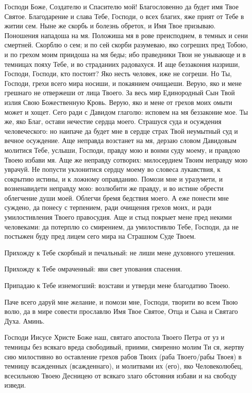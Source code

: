\begin{mymulticols}

Господи Боже, Создателю и Спасителю мой! Благословенно да будет имя Твое Святое. Благодарение и слава Тебе, Господи, о всех благих, яже прият от Тебе в житии сем. Ныне же скорбь и болезнь обретох, и Имя Твое призываю. Поношения нападоша на мя. Положиша мя в рове преисподнем, в темных и сени смертней. Скорблю о сем; и по сей скорби разумеваю, яко согреших пред Тобою, и по грехом моим приидоша на мя беды; ибо праведники Твои не унывающе и в темницах пояху Тебе, и во страданиих радовахуся. И аще беззакония назриши, Господи, Господи, кто постоит? Яко несть человек, иже не согреши. Но Ты, Господи, грехи всего мира носиши, и покаянием очищаеши. Верую, яко и мене грешнаго не отвержеши от лица Твоего. За весь мир Единородный Сын Твой излия Свою Божественную Кровь. Верую, яко и мене от грехов моих омыти может и хощет. Сего ради с Давидом глаголю: исповем на мя беззаконие мое. Ты же, яко Благ, остави нечестие сердца моего. Страшуся суда и осуждения человеческого: но наипаче да будет мне в сердце страх Твой неумытный суд и вечное осуждение. Аще неправда возстанет на мя, дерзаю словом Давидовым молитися Тебе, услыши, Господи, правду мою и вонми суду моему, и правдою Твоею избави мя. Аще же неправду сотворих: милосердием Твоим неправду мою уврачуй. Не попусти уклонитися сердцу моему во словеса лукавствия, к сокрытию истины, и к ложному оправданию. Помози мне и уразумети, и возненавидети неправду мою: возлюбити же правду, и во истине обрести облегчение души моей. Облегчи бремя бедствия моего. А еже понести мне суждено, да понесу с терпением, ради очищения грехов моих, и ради умилостивления Твоего правосудия. Аще и стыд покрыет мене пред некими человеками: да потерплю со смирением, да умилостивлю Тебе, Господи, да не постыжен буду пред лицем сего мира на Страшном Суде Твоем.

Прихожду к Тебе скорбный и печальный: не лиши мене духовного утешения. 

Прихожду к Тебе омраченный: яви свет упования спасения. 

Припадаю к Тебе изнемогший: возстави и утверди мене благодатию Твоею. 

Паче всего даруй мне желание, и помози мне, Господи, творити во всем Твою волю, да в мире совести прославлю Имя Твое Святое, Отца и Сына и Святаго Духа. Аминь.

\end{mymulticols}

\mychapterending

\begin{mymulticols}


Господи Иисусе Христе Боже наш, святаго апостола Твоего Петра от уз и темницы без всякаго вреда свободивый, приими, смиренно молим Ти ся, жертву сию милостивно во оставление грехов рабов Твоих (раба Твоего/рабы Твоея)  в темницу всажденных (всажденнаго), и молитвами их (его), яко Человеколюбец, всесильною Твоею Десницею от всякаго злаго обстояния избави и на свободу изведи.

\end{mymulticols}

\mychapterending

